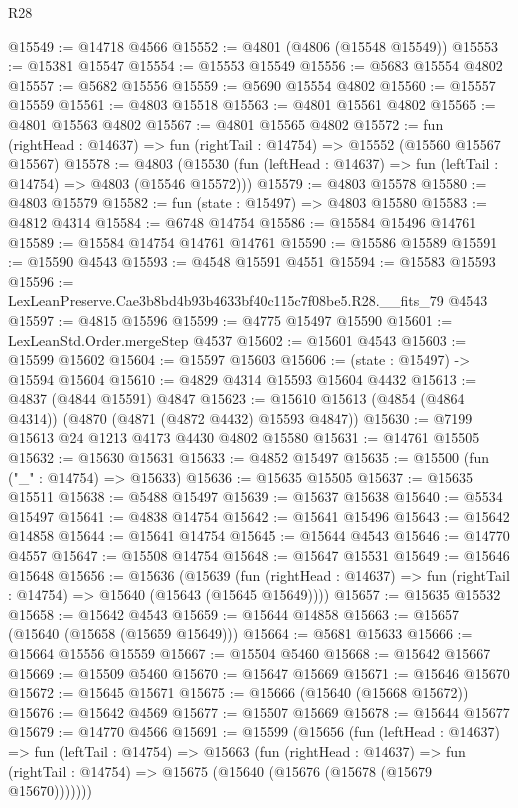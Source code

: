 \begin{lexlean}{R28}
\begin{coremodule}
@15549 := @14718 @4566
@15552 := @4801 (@4806 (@15548 @15549))
@15553 := @15381 @15547
@15554 := @15553 @15549
@15556 := @5683 @15554 @4802
@15557 := @5682 @15556
@15559 := @5690 @15554 @4802
@15560 := @15557 @15559
@15561 := @4803 @15518
@15563 := @4801 @15561 @4802
@15565 := @4801 @15563 @4802
@15567 := @4801 @15565 @4802
@15572 := fun (rightHead : @14637) => fun (rightTail : @14754) => @15552 (@15560 @15567 @15567)
@15578 := @4803
    (@15530 (fun (leftHead : @14637) => fun (leftTail : @14754) => @4803 (@15546 @15572)))
@15579 := @4803 @15578
@15580 := @4803 @15579
@15582 := fun (state : @15497) => @4803 @15580
@15583 := @4812 @4314
@15584 := @6748 @14754
@15586 := @15584 @15496 @14761
@15589 := @15584 @14754 @14761 @14761
@15590 := @15586 @15589
@15591 := @15590 @4543
@15593 := @4548 @15591 @4551
@15594 := @15583 @15593
@15596 := LexLeanPreserve.Cae3b8bd4b93b4633bf40c115c7f08be5.R28.__fits_79 @4543
@15597 := @4815 @15596
@15599 := @4775 @15497 @15590
@15601 := LexLeanStd.Order.mergeStep @4537
@15602 := @15601 @4543
@15603 := @15599 @15602
@15604 := @15597 @15603
@15606 := (state : @15497) -> @15594 @15604
@15610 := @4829 @4314 @15593 @15604 @4432
@15613 := @4837 (@4844 @15591) @4847
@15623 := @15610 @15613 (@4854 (@4864 @4314)) (@4870 (@4871 (@4872 @4432) @15593 @4847))
@15630 := @7199 @15613 @24 @1213 @4173 @4430 @4802 @15580
@15631 := @14761 @15505
@15632 := @15630 @15631
@15633 := @4852 @15497
@15635 := @15500 (fun ("_" : @14754) => @15633)
@15636 := @15635 @15505
@15637 := @15635 @15511
@15638 := @5488 @15497
@15639 := @15637 @15638
@15640 := @5534 @15497
@15641 := @4838 @14754
@15642 := @15641 @15496
@15643 := @15642 @14858
@15644 := @15641 @14754
@15645 := @15644 @4543
@15646 := @14770 @4557
@15647 := @15508 @14754
@15648 := @15647 @15531
@15649 := @15646 @15648
@15656 := @15636
    (@15639
      (fun (rightHead : @14637) => fun (rightTail : @14754) => @15640 (@15643 (@15645 @15649))))
@15657 := @15635 @15532
@15658 := @15642 @4543
@15659 := @15644 @14858
@15663 := @15657 (@15640 (@15658 (@15659 @15649)))
@15664 := @5681 @15633
@15666 := @15664 @15556 @15559
@15667 := @15504 @5460
@15668 := @15642 @15667
@15669 := @15509 @5460
@15670 := @15647 @15669
@15671 := @15646 @15670
@15672 := @15645 @15671
@15675 := @15666 (@15640 (@15668 @15672))
@15676 := @15642 @4569
@15677 := @15507 @15669
@15678 := @15644 @15677
@15679 := @14770 @4566
@15691 := @15599
    (@15656
      (fun (leftHead : @14637) =>
      fun (leftTail : @14754) =>
      @15663
        (fun (rightHead : @14637) =>
        fun (rightTail : @14754) => @15675 (@15640 (@15676 (@15678 (@15679 @15670)))))))

\end{coremodule}
\end{lexlean}
